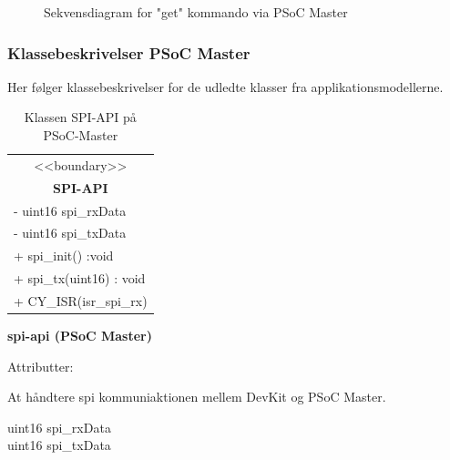 \begin{figure}[H] \centering
    \caption{Sekvensdiagram for "get" kommando via PSoC Master}
    \label{fig:sekvensdiagram_psoc_master_get}
\end{figure}

\subsubsection{Klassebeskrivelser PSoC Master}

Her følger klassebeskrivelser for de udledte klasser fra applikationsmodellerne.

\begin{table}[H]
    \centering
    \begin{tabular}{|l|}
    \hline
    \multicolumn{1}{|c|}{<<boundary>>} \\
    \multicolumn{1}{|c|}{\textbf{SPI-API}} \\
    \hline
    - uint16 spi\_rxData \\
    - uint16 spi\_txData \\
    \hline
    + spi\_init() :void \\
    + spi\_tx(uint16) : void \\
    + CY\_ISR(isr\_spi\_rx) \\
    \hline
    \end{tabular}
    \caption{Klassen SPI-API på PSoC-Master}
    \label{tab:classSpiApiPSoCMaster}
\end{table}

{\centering\textbf{spi-api (PSoC Master)}\par}

\begin{labeling}{Attributter:}
\item[Ansvar:] At håndtere spi kommuniaktionen mellem DevKit og PSoC Master.
\item[Attributter:] uint16 spi\_rxData \\
uint16 spi\_txData
\end{labeling}

